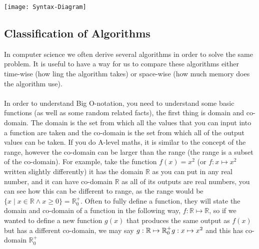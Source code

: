   \texttt{[image: Syntax-Diagram]}
  
\subsection{Classification of Algorithms}
  
  \noindent
  In computer science we often derive several algorithms in order to solve the same problem. It is useful to have a way for us to compare these algorithms either time-wise (how ling the algorithm takes) or space-wise (how much memory does the algorithm use).\\ \\
  \noindent
  In order to understand Big O-notation, you need to understand some basic functions (as well as some random related facts), the first thing is domain and co-domain. The domain is the set from which all the values that you can input into a function are taken and the co-domain is the set from which all of the output values can be taken. If you do A-level maths, it is similar to the concept of the range, however the co-domain can be larger than the range (the range is a subset of the co-domain). For example, take the function $f(x)=x^2$ (or $f: x \mapsto x^2$ written slightly differently) it has the domain $\mathbb{R}$ as you can put in any real number, and it can have co-domain $\mathbb{R}$ as all of its outputs are real numbers, you can see how this can be different to range, as the range would be $\{x \mid x \in \mathbb{R} \wedge x \geq 0\} = \mathbb{R}_0^+$. Often to fully define a function, they will state the domain and co-domain of a function in the following way, $f: \mathbb{R} \mapsto \mathbb{R}$, so if we wanted to define a new function $g(x)$ that produces the same output as $f(x)$ but has a different co-domain, we may say $g: \mathbb{R} \mapsto \mathbb{R}_0^+ \\ g: x \mapsto x^2$ and this has co-domain $\mathbb{R}_0^+$
  
